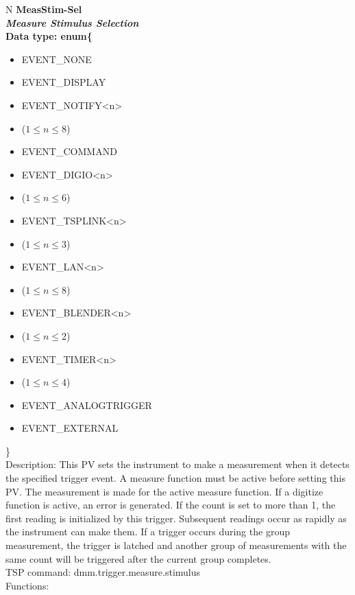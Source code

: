 \documentclass[openany]{article}
\begin{document}
		\begin{tabular}{N}
			\hline
			\bfseries MeasStim-Sel\label{pv:measstim-sel} \\ \hline
			\emph{Measure Stimulus Selection} \\
			Data type: enum\{\begin{itemize}[noitemsep]
				\small
				\item[] EVENT\_NONE
				\item[] EVENT\_DISPLAY
				\item[] EVENT\_NOTIFY\textless n\textgreater
				\item[] ($1\leq n\leq 8$)
				\item[] EVENT\_COMMAND
				\item[] EVENT\_DIGIO\textless n\textgreater
				\item[] ($1\leq n\leq 6$)
				\item[] EVENT\_TSPLINK\textless n\textgreater
				\item[] ($1\leq n\leq 3$)
				\item[] EVENT\_LAN\textless n\textgreater
				\item[] ($1\leq n\leq 8$)
				\item[] EVENT\_BLENDER\textless n\textgreater 
				\item[] ($1\leq n\leq 2$)
				\item[] EVENT\_TIMER\textless n\textgreater
				\item[] ($1\leq n\leq 4$)
				\item[] EVENT\_ANALOGTRIGGER
				\item[] EVENT\_EXTERNAL
			\end{itemize}\} \\
			Description: This PV sets the instrument to make a measurement when it detects the specified trigger event. A measure function must be active before setting this PV. The measurement is made for the active measure function. If a digitize function is active, an error is generated. If the count is set to more than 1, the first reading is initialized by this trigger. Subsequent readings occur as rapidly as the instrument can make them. If a trigger occurs during the group measurement, the trigger is latched and another group of measurements with the same count will be triggered after the current group completes. \\
			TSP command: dmm.trigger.measure.stimulus \\
			Functions: \\
			\arrayrulecolor{\FuncTableBorderColor}

		\end{tabular}
\end{document}
